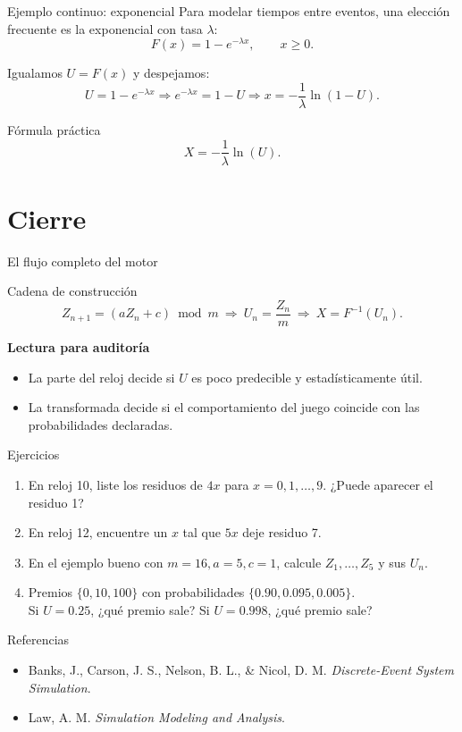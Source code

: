 \documentclass[aspectratio=1610, 9pt]{beamer}
\begin{document}
\begin{frame}{Ejemplo continuo: exponencial}
    Para modelar tiempos entre eventos, una elección frecuente es la exponencial con tasa $\lambda$:
    \[
    F(x)=1-e^{-\lambda x},\qquad x\ge 0.
    \]

    \vspace{0.25cm}
    Igualamos $U=F(x)$ y despejamos:
    \[
    U=1-e^{-\lambda x}
    \Rightarrow
    e^{-\lambda x}=1-U
    \Rightarrow
    x=-\frac{1}{\lambda}\ln(1-U).
    \]

    \vspace{0.25cm}
    \begin{block}{Fórmula práctica}
    \[
    X=-\frac{1}{\lambda}\ln(U).
    \]
    \end{block}
\end{frame}

\section{Cierre}

\begin{frame}{El flujo completo del motor}
    \begin{block}{Cadena de construcción}
    \[
    Z_{n+1}=(aZ_n+c)\bmod m
    \ \Rightarrow\
    U_n=\frac{Z_n}{m}
    \ \Rightarrow\
    X=F^{-1}(U_n).
    \]
    \end{block}

    \vspace{0.25cm}
    \textbf{Lectura para auditoría}
    \begin{itemize}
        \item La parte del reloj decide si $U$ es poco predecible y estadísticamente útil.
        \item La transformada decide si el comportamiento del juego coincide con las probabilidades declaradas.
    \end{itemize}
\end{frame}

\begin{frame}{Ejercicios}
    \begin{enumerate}
        \item En reloj 10, liste los residuos de $4x$ para $x=0,1,\dots,9$. ¿Puede aparecer el residuo 1?
        \item En reloj 12, encuentre un $x$ tal que $5x$ deje residuo 7.
        \item En el ejemplo bueno con $m=16,a=5,c=1$, calcule $Z_1,\dots,Z_5$ y sus $U_n$.
        \item Premios $\{0,10,100\}$ con probabilidades $\{0.90,0.095,0.005\}$.\\
              Si $U=0.25$, ¿qué premio sale? Si $U=0.998$, ¿qué premio sale?
    \end{enumerate}
\end{frame}

\begin{frame}{Referencias}
    \small
    \begin{itemize}
        \item Banks, J., Carson, J. S., Nelson, B. L., \& Nicol, D. M. \textit{Discrete-Event System Simulation}.
        \item Law, A. M. \textit{Simulation Modeling and Analysis}.
    \end{itemize}
\end{frame}
\end{document}
